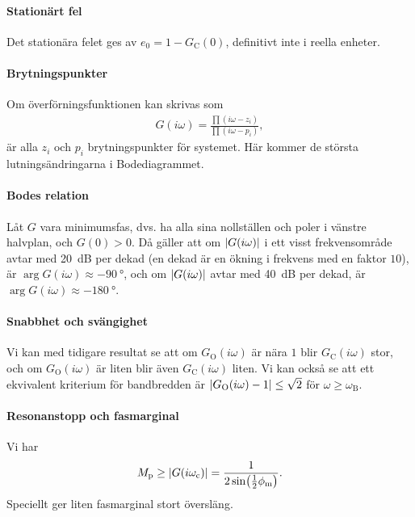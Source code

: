 \paragraph{Stationärt fel}
Det stationära felet ges av $e_{0} = 1 - G_{\text{C}}(0)$, definitivt inte i reella enheter.

\paragraph{Brytningspunkter}
Om överförningsfunktionen kan skrivas som
\begin{align*}
	G(i\omega) = \frac{\prod(i\omega - z_{i})}{\prod(i\omega - p_{i})},
\end{align*}
är alla $z_{i}$ och $p_{i}$ brytningspunkter för systemet. Här kommer de största lutningsändringarna i Bodediagrammet.

\paragraph{Bodes relation}
Låt $G$ vara minimumsfas, dvs. ha alla sina nollställen och poler i vänstre halvplan, och $G(0) > 0$. Då gäller att om $\abs{G(i\omega)}$ i ett visst frekvensområde avtar med \SI{20}{\deci\bel} per dekad (en dekad är en ökning i frekvens med en faktor $10$), är $\arg{G(i\omega)}\approx \SI{-90}{\degree}$, och om $\abs{G(i\omega)}$ avtar med \SI{40}{\deci\bel} per dekad, är $\arg{G(i\omega)}\approx \SI{-180}{\degree}$.

\paragraph{Snabbhet och svängighet}
Vi kan med tidigare resultat se att om $G_{\text{O}}(i\omega)$ är nära $1$ blir $G_{\text{C}}(i\omega)$ stor, och om $G_{\text{O}}(i\omega)$ är liten blir även $G_{\text{C}}(i\omega)$ liten. Vi kan också se att ett ekvivalent kriterium för bandbredden är $\abs{G_{\text{O}}(i\omega) - 1} \leq \sqrt{2}$ för $\omega \geq \omega_{\text{B}}$.

\paragraph{Resonanstopp och fasmarginal}
Vi har
\begin{align*}
	M_{\text{p}} \geq \abs{G(i\omega_{\text{c}})} = \frac{1}{2\sin(\frac{1}{2}\phi_{\text{m}})}.
\end{align*}
Speciellt ger liten fasmarginal stort översläng.

